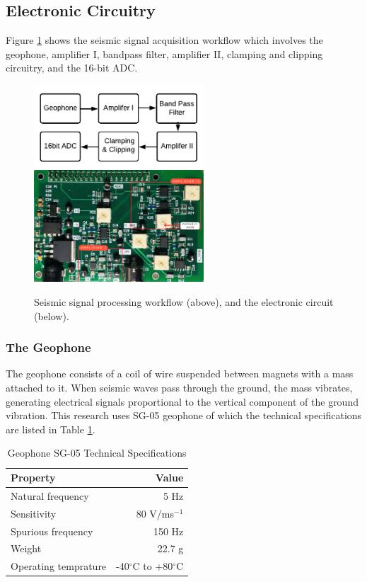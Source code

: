 \documentclass[applsci,article,accept,moreauthors,pdftex]{Definitions/mdpi}
\begin{document}
\subsection{Electronic Circuitry}
Figure \ref{hw design} shows the seismic signal acquisition workflow which involves the geophone, amplifier I, bandpass filter, amplifier II, clamping and clipping circuitry, and the 16-bit ADC.  
\begin{figure}[h]
	\begin{center}
		\includegraphics[width=2.5in]{figures/cct_block}\\
		\includegraphics[width=2.5in]{figures/circuit}
		\caption{Seismic signal processing workflow (above), and the electronic circuit (below).}
		\label{hw design}
	\end{center}
\end{figure}

\subsubsection{The Geophone}
The geophone consists of a coil of wire suspended between magnets with a mass attached to it. When seismic waves pass through the ground, the mass vibrates, generating electrical signals proportional to the vertical component of the ground vibration. This research uses SG-05 geophone of which the technical specifications are listed in Table \ref{table:geophone}. 
\begin{table}[h]
	\caption{Geophone SG-05 Technical Specifications}
	\centering
	\begin{tabular}{l r}
		\hline\hline
		Property & Value\\
		\hline
		Natural frequency &  5 Hz\\
		Sensitivity &  80 V/ms$^{-1}$\\
		Spurious frequency &  150 Hz\\
		Weight  &  22.7 g\\
		Operating temprature  &  -40$^{\circ}$C to +80$^{\circ}$C\\
		\hline
	\end{tabular}
	\label{table:geophone}
\end{table}
\end{document}
